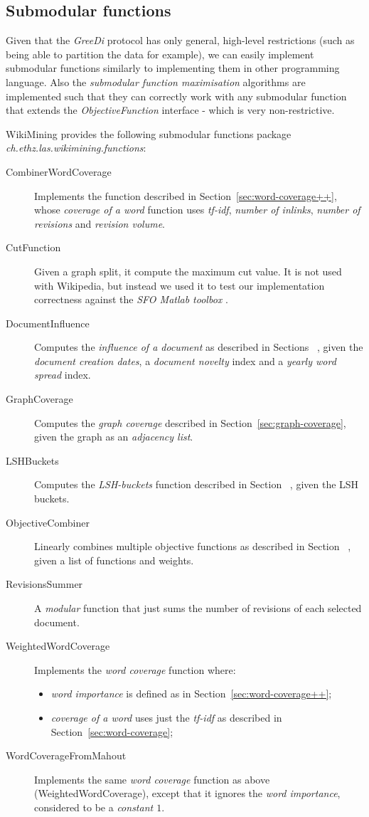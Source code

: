\subsection{Submodular functions}

Given that the \emph{GreeDi} protocol has only general, high-level restrictions
(such as being able to partition the data for example), we can easily implement
submodular functions similarly to implementing them in other programming
language. Also the \emph{submodular function maximisation} algorithms are
implemented such that they can correctly work with any submodular function that
extends the \emph{ObjectiveFunction} interface - which is very non-restrictive.

WikiMining provides the following submodular functions package
\emph{ch.ethz.las.wikimining.functions}:
\begin{description}
  \item[CombinerWordCoverage] Implements the function described in
  Section~\vref{sec:word-coverage++}, whose \emph{coverage of a word} function
  uses \emph{tf-idf}, \emph{number of inlinks}, \emph{number of revisions} and
  \emph{revision volume}.
  \item[CutFunction] Given a graph split, it compute the maximum cut value. It
  is not used with Wikipedia, but instead we used it to test our implementation
  correctness against the \emph{SFO Matlab toolbox} \cite{krause2010sfo}.
  \item[DocumentInfluence] Computes the \emph{influence of a document} as
  described in Sections~ , given the
  \emph{document creation dates}, a \emph{document novelty} index and a
  \emph{yearly word spread} index.
  \item[GraphCoverage] Computes the \emph{graph coverage} described in
  Section~\vref{sec:graph-coverage}, given the graph as an \emph{adjacency
  list}.
  \item[LSHBuckets] Computes the \emph{\ac{LSH}-buckets} function described in
  Section~ , given the \ac{LSH} buckets.
  \item[ObjectiveCombiner] Linearly combines multiple objective functions as
  described in Section~ , given a list of
  functions and weights.
  \item[RevisionsSummer] A \emph{modular} function that just sums the number of
  revisions of each selected document.
  \item[WeightedWordCoverage] Implements the \emph{word coverage} function
  where:
    \begin{itemize}
      \item \emph{word importance} is defined as in
      Section~\vref{sec:word-coverage++};
      \item \emph{coverage of a word} uses just the \emph{tf-idf} as described
      in Section~\vref{sec:word-coverage};
    \end{itemize}
  \item[WordCoverageFromMahout] Implements the same \emph{word coverage}
  function as above (WeightedWordCoverage), except that it ignores the
  \emph{word importance}, considered to be a \emph{constant \(1\)}.
\end{description}
